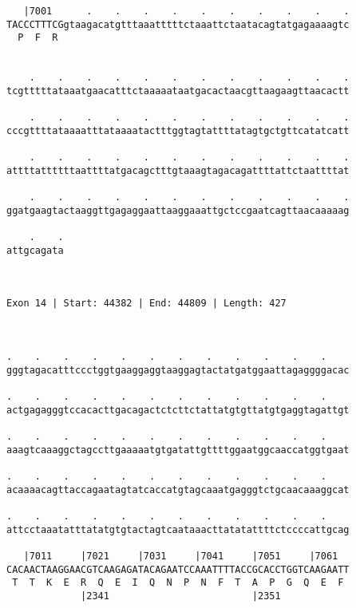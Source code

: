 \documentclass{article}
\begin{document}
\begin{Verbatim}
   |7001      .    .    .    .    .    .    .    .    .    .
TACCCTTTCGgtaagacatgtttaaatttttctaaattctaatacagtatgagaaaagtc
  P  F  R                                                   
                                                            
  
    .    .    .    .    .    .    .    .    .    .    .    .
tcgtttttataaatgaacatttctaaaaataatgacactaacgttaagaagttaacactt
                                                            
    .    .    .    .    .    .    .    .    .    .    .    .
cccgttttataaaatttataaaatactttggtagtattttatagtgctgttcatatcatt
                                                            
    .    .    .    .    .    .    .    .    .    .    .    .
attttattttttaattttatgacagctttgtaaagtagacagattttattctaattttat
                                                            
    .    .    .    .    .    .    .    .    .    .    .    .
ggatgaagtactaaggttgagaggaattaaggaaattgctccgaatcagttaacaaaaag
                                                            
    .    .
attgcagata
          
          
 
Exon 14 | Start: 44382 | End: 44809 | Length: 427



.    .    .    .    .    .    .    .    .    .    .    .    
gggtagacatttccctggtgaaggaggtaaggagtactatgatggaattagaggggacac
                                                            
.    .    .    .    .    .    .    .    .    .    .    .    
actgagagggtccacacttgacagactctcttctattatgtgttatgtgaggtagattgt
                                                            
.    .    .    .    .    .    .    .    .    .    .    .    
aaagtcaaaggctagccttgaaaaatgtgatattgttttggaatggcaaccatggtgaat
                                                            
.    .    .    .    .    .    .    .    .    .    .    .    
acaaaacagttaccagaatagtatcaccatgtagcaaatgagggtctgcaacaaaggcat
                                                            
.    .    .    .    .    .    .    .    .    .    .    .    
attcctaaatatttatatgtgtactagtcaataaacttatatattttctccccattgcag
                                                            
   |7011     |7021     |7031     |7041     |7051     |7061  
CACAACTAAGGAACGTCAAGAGATACAGAATCCAAATTTTACCGCACCTGGTCAAGAATT
 T  T  K  E  R  Q  E  I  Q  N  P  N  F  T  A  P  G  Q  E  F 
             |2341                         |2351            
  

\end{Verbatim}
\end{document}
